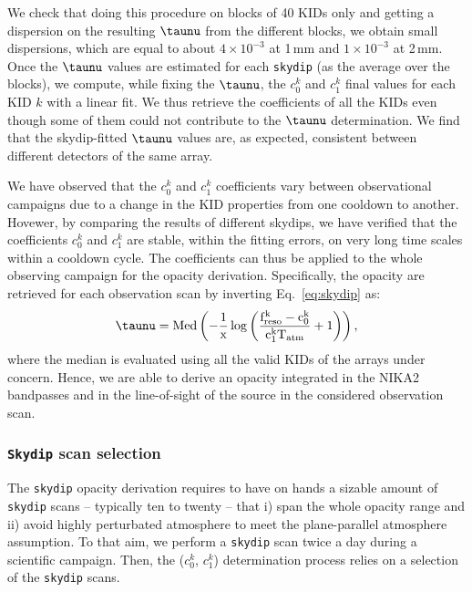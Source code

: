 %
{\lp We check that doing this procedure on blocks of 40 KIDs only and
getting a dispersion on the resulting $\taunu$ from the different
blocks, we obtain small dispersions, which are equal to about
$4\times 10^{-3}$ at 1\,mm and $1\times 10^{-3}$ at 2\,mm. }
Once the $\taunu$ values are estimated for each {\tt skydip} (as the average over the
blocks), we compute, while fixing the $\taunu$, the $c_0^k$ and $c_1^k$
final values for each KID $k$ with a linear fit. We thus retrieve
the coefficients of all the KIDs even though some of them could not
contribute to the $\taunu$ determination. We find that the skydip-fitted
$\taunu$ values are, as expected, consistent between different detectors of
the same array.

{\lp We have observed that the  $c_0^k$ and $c_1^k$ coefficients vary
between observational campaigns due to a change in the KID properties
from one cooldown to another.}
Hovewer, by comparing the results of different skydips, we have verified that the
coefficients $c_0^k$ and $c_1^k$ are stable, within the fitting errors, on very
long time scales within a cooldown cycle. The coefficients can thus be
applied to the whole observing campaign for the opacity derivation. %
Specifically, the opacity %
are retrieved for each observation scan by
inverting Eq.~\ref{eq:skydip} as:
\begin{equation}
\taunu =   \rm{Med}\left( -\frac{1}{x} \log\left( \frac{f_{\rm{reso}}^k - c_0^k}{c_1^kT_{\rm{atm}}} +1 \right)\right), 
\end{equation}
where the median is evaluated using all the valid
KIDs of the arrays under concern. Hence, we are able to derive an opacity
integrated in the NIKA2 bandpasses and in the line-of-sight of the
source in the considered observation scan.

\subsubsection{{\tt Skydip} scan selection}
\label{se:skydip-selection}

The {\tt skydip} opacity derivation requires to have on hands a
sizable amount of {\tt skydip} scans --
typically ten to twenty -- that i) span the whole opacity range and
ii) avoid highly perturbated atmosphere to meet the plane-parallel
atmosphere assumption. To that aim, we perform a {\tt skydip}
scan twice a day during a scientific campaign. Then, the ($c_0^k$, $c_1^k$)
determination process relies on a selection of the {\tt skydip} scans.

